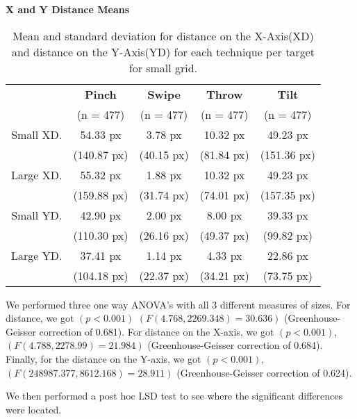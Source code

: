 \begin{table}[H]
	\centering
	\textbf{X and Y Distance Means}\\[4pt]
	\begin{adjustbox}{width=\columnwidth}
	\begin{tabular}{|c|c|c|c|c|}
		\hline
		\rowcolor[HTML]{9B9B9B} 
		& \textbf{Pinch} & \textbf{Swipe} & \textbf{Throw} & \textbf{Tilt} \\
		\rowcolor[HTML]{9B9B9B} 
		& (n = 477) & (n = 477) & (n = 477) & (n = 477) \\ \hline
		Small XD. & 54.33 px & 3.78 px & 10.32 px & 49.23 px \\
		& (140.87 px) & (40.15 px) & (81.84 px) & (151.36 px) \\ \hline
		Large XD. & 55.32 px & 1.88 px & 10.32 px & 49.23 px \\
		& (159.88 px) & (31.74 px) & (74.01 px) & (157.35 px) \\ \hline
		Small YD. & 42.90 px & 2.00 px & 8.00 px & 39.33 px \\
		& (110.30 px) & (26.16 px) & (49.37 px) & (99.82 px) \\ \hline
		Large YD. & 37.41 px & 1.14 px & 4.33 px & 22.86 px \\
		& (104.18 px) & (22.37 px) & (34.21 px) & (73.75 px) \\ \hline
	\end{tabular}
	\end{adjustbox}
	\caption{Mean and standard deviation for distance on the X-Axis(XD) and distance on the Y-Axis(YD) for each technique per target for small grid.}
	\label{tab:distanceXY}
\end{table}

We performed three one way ANOVA's with all 3 different measures of sizes.
For distance, we got $(p<0.001)$ $(F(4.768, 2269.348) = 30.636)$ (Greenhouse-Geisser correction of 0.681).
For distance on the X-axis, we got $(p<0.001)$, $(F(4.788,2278.99) = 21.984)$ (Greenhouse-Geisser correction of 0.684).
Finally, for the distance on the Y-axis, we got $(p<0.001)$, $(F(248987.377, 8612.168)=28.911)$ (Greenhouse-Geisser correction of 0.624).

We then performed a post hoc LSD test to see where the significant differences were located. 
